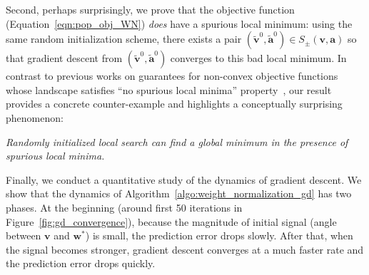 \documentclass{article}
\newcommand{\firstlayer}{w}
\newcommand{\firstlayerWN}{v}
\newcommand{\secondlayer}{a}
\def\va{\mathbf{a}}
\def\vv{\mathbf{v}}
\newcommand{\vect}[1]{\mathbf{#1}}
\begin{document}
Second, perhaps surprisingly, we prove that the objective function (Equation~\eqref{eqn:pop_obj_WN}) \emph{does} have a spurious local minimum: using the same random initialization scheme, there exists a pair $(\vect{\tilde \firstlayerWN}^{0},\vect{\tilde \secondlayer}^{0}) \in S_\pm(\vv, \va)$ so that gradient descent from $(\vect{\tilde\firstlayerWN}^0,\vect{\tilde\secondlayer}^0)$ converges to this bad local minimum.
In contrast to previous works on guarantees for non-convex objective functions whose landscape satisfies ``no spurious local minima'' property~\citep{li2016symmetry,ge2017no,ge2016matrix,bhojanapalli2016global,ge2017learning,kawaguchi2016deep}, our result provides a concrete counter-example and highlights a conceptually surprising phenomenon: 
\begin{center}
\emph{Randomly initialized local search can find a global minimum in the presence of spurious local minima.}
\end{center}

Finally, we conduct a quantitative study of the dynamics of gradient descent.
We show that the dynamics of Algorithm~\ref{algo:weight_normalization_gd} has two phases. 
At the beginning (around first 50 iterations in Figure~\ref{fig:gd_convergence}), because the magnitude of initial signal (angle between $\vect{\firstlayerWN}$ and $\vect{\firstlayer}^*$) is small, the prediction error drops slowly. 
After that, when the signal becomes stronger, gradient descent converges at a much faster rate and the prediction error drops quickly.
\end{document}
